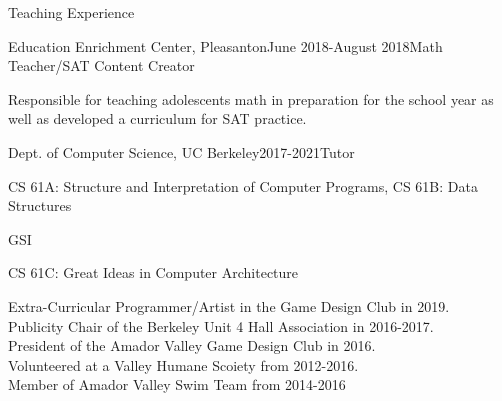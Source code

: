 \documentclass{resume} %
\begin{document}

\begin{rSection}{Teaching Experience} 
\begin{rSubsection}{Education Enrichment Center, Pleasanton}{June 2018-August 2018}{Math Teacher/SAT Content Creator}{}
\item Responsible for teaching adolescents math in preparation for the school year as well as developed a curriculum for SAT practice.
\end{rSubsection}

\begin{rSubsection}{Dept. of Computer Science, UC Berkeley}{2017-2021}{Tutor}{}
\item CS 61A: Structure and Interpretation of Computer Programs, CS 61B: Data Structures
\end{rSubsection}

\begin{rSubsubsection}{GSI}{}
\item CS 61C: Great Ideas in Computer Architecture
\end{rSubsubsection}

\end{rSection}

\begin{rSection}{Extra-Curricular} \itemsep -3pt
Programmer/Artist in the Game Design Club in 2019. \\
Publicity Chair of the Berkeley Unit 4 Hall Association in 2016-2017. \\
President of the Amador Valley Game Design Club in 2016. \\
Volunteered at a Valley Humane Scoiety from 2012-2016. \\
Member of Amador Valley Swim Team from 2014-2016
\end{rSection}

%
\end{document}
